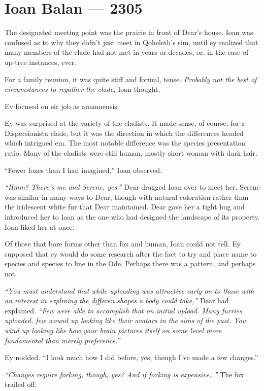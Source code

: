 \hypertarget{ioan-balan-2305}{%
\chapter*{Ioan Balan — 2305}\label{ioan-balan-2305}}

The designated meeting point was the prairie in front of Dear's house. Ioan was confused as to why they didn't just meet in Qoheleth's sim, until ey realized that many members of the clade had not met in years or decades, or, in the case of up-tree instances, ever.

For a family reunion, it was quite stiff and formal, tense. \emph{Probably not the best of circumstances to regather the clade,} Ioan thought.

Ey focused on eir job as amanuensis.

Ey was surprised at the variety of the cladists. It made sense, of course, for a Dispersionista clade, but it was the direction in which the differences headed which intrigued em. The most notable difference was the species presentation ratio. Many of the cladists were still human, mostly short woman with dark hair.

``Fewer foxes than I had imagined,'' Ioan observed.

\emph{``Hmm? There's me and Serene, yes.''} Dear dragged Ioan over to meet her. Serene was similar in many ways to Dear, though with natural coloration rather than the iridescent white fur that Dear maintained. Dear gave her a tight hug and introduced her to Ioan as the one who had designed the landscape of its property. Ioan liked her at once.

Of those that bore forms other than fox and human, Ioan could not tell. Ey supposed that ey would do some research after the fact to try and place name to species and species to line in the Ode. Perhaps there was a pattern, and perhaps not.

\emph{``You must understand that while uploading was attractive early on to those with an interest in explroing the differen shapes a body could take,''} Dear had explained. \emph{``Few were able to accomplish that on initial upload. Many furries uploaded, few wound up looking like their avatars in the sims of the past. You wind up looking like how your brain pictures itself on some level more fundamental than merely preference.''}

Ey nodded. ``I look much how I did before, yes, though I've made a few changes.''

\emph{``Changes require forking, though, yes? And if forking is expensive\ldots{}''} The fox trailed off.

